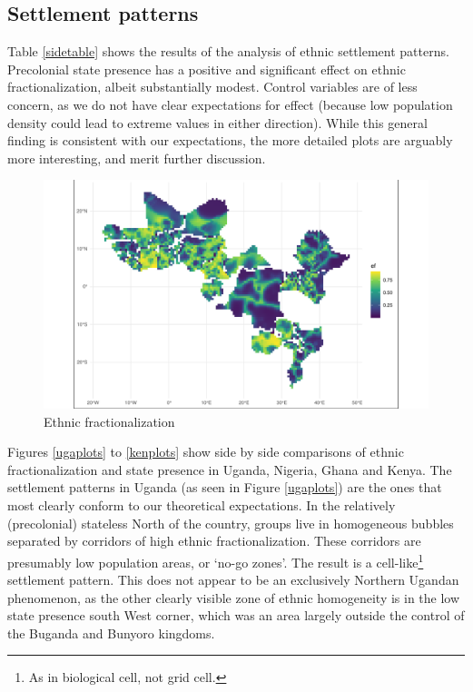\subsection{Settlement patterns} \label{Settlement patterns}

Table \ref{sidetable} shows the results of the analysis of ethnic settlement
patterns. Precolonial state presence has a positive and significant effect on
ethnic fractionalization, albeit substantially modest. Control variables are of
less concern, as we do not have clear expectations for effect (because low
population density could lead to extreme values in either direction). While this
general finding is consistent with our expectations, the more detailed plots are
arguably more interesting, and merit further discussion.

\begin{figure}[htpb]
	\centering
	\includegraphics[width=1\linewidth]{R/Output/ethplot.pdf}
	\caption{Ethnic fractionalization}%
	\label{ethplot}
\end{figure}

Figures \ref{ugaplots} to \ref{kenplots} show side by side comparisons of ethnic
fractionalization and state presence in Uganda, Nigeria, Ghana and Kenya. The
settlement patterns in Uganda  (as seen in Figure \ref{ugaplots}) are the ones
that most clearly conform to our theoretical expectations. In the relatively
(precolonial) stateless North of the country, groups live in homogeneous bubbles
separated by corridors of high ethnic fractionalization. These corridors are
presumably low population areas, or `no-go zones'. The result is a
cell-like\footnote{As in biological cell, not grid cell.} settlement pattern.
This does not appear to be an exclusively Northern Ugandan phenomenon, as the
other clearly visible zone of ethnic homogeneity is in the low state presence
south West corner, which was an area largely outside the control of the Buganda
and Bunyoro kingdoms.

